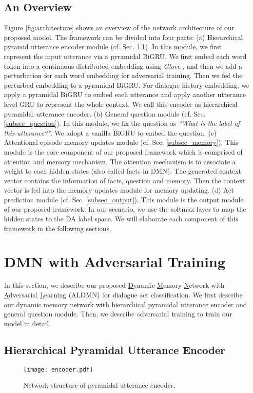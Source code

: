\documentclass[conference]{IEEEtran}
\begin{document}
	\subsection{An Overview}
	Figure \ref{fig:architecture} shows an overview of the network architecture of our proposed model. The framework can be divided into four parts: (a) Hierarchical pyramid utterance encoder module (cf. Sec. \ref{subsec_pyramid}). In this module, we first represent the input utterance via a pyramidal BiGRU. We first embed each word token into a continuous distributed embedding using \textit{Glove} \cite{pennington2014glove}, and then we add a perturbation for each word embedding for adversarial training. Then we fed the perturbed embedding to a pyramidal BiGRU. For dialogue history embedding, we apply a pyramidal BiGRU to embed each utterance and apply another utterance level GRU to represent the whole context. We call this encoder as hierarchical pyramidal utterance encoder.
	(b) General question module (cf. Sec. \ref{subsec_question}). In this module, we fix the question as \textit{``What is the label of this utterance?"}. We adopt a vanilla BiGRU to embed the question.
	(c) Attentional episode memory updates module (cf. Sec. \ref{subsec_memory}). This module is the core component of our proposed framework which is comprised of attention and memory mechanism. The attention mechanism is to associate a weight to each hidden states (also called facts in DMN). The generated context vector contains the information of facts, question and memory. Then the context vector is fed into the memory updates module for memory updating.
	(d) Act prediction module (cf. Sec. \ref{subsec_output}). This module is the output module of our proposed framework. In our scenario, we use the softmax layer to map the hidden states to the DA label space. We will elaborate each component of this framework in the following sections.
	
	
	\section{DMN with Adversarial Training} \label{sec_model}In this section, we describe our proposed \underline{D}ynamic \underline{M}emory \underline{N}etwork with \underline{A}dversarial \underline{L}earning (ALDMN) for dialogue act classification. We first describe our dynamic memory network with hierarchical pyramidal utterance encoder and general question module. Then, we describe adversarial training to train our model in detail.
	\subsection{Hierarchical Pyramidal Utterance Encoder} \label{subsec_pyramid}
	\begin{figure}[!t]
		\centering
		\texttt{[image: encoder.pdf]}
		\caption{Network structure of pyramidal utterance encoder.}
		\label{fig:sns_heatmap_eg1}
	\end{figure}
	
\end{document}

